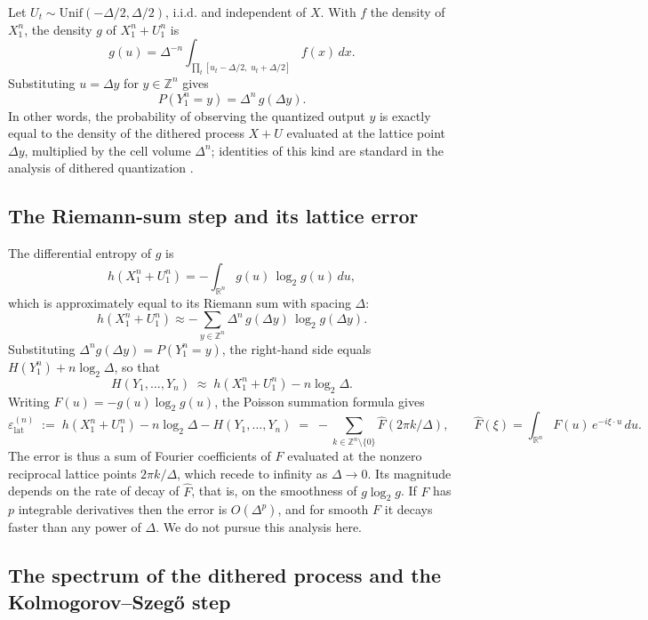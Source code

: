 \documentclass[11pt]{article}
\begin{document}
Let \(U_t \sim \mathrm{Unif}(-\Delta/2,\Delta/2)\), i.i.d. and independent of \(X\). With \(f\) the density of \(X_1^n\), the density \(g\) of \(X_1^n + U_1^n\) is
\[g(u) = \Delta^{-n}\int_{\prod_t [u_t - \Delta/2,\; u_t + \Delta/2]} f(x)\,dx.\]
Substituting \(u = \Delta y\) for \(y\in\mathbb Z^n\) gives
\[P(Y_1^n = y) = \Delta^n\,g(\Delta y).\]
In other words, the probability of observing the quantized output \(y\) is exactly equal to the density of the dithered process \(X + U\) evaluated at the lattice point \(\Delta y\), multiplied by the cell volume \(\Delta^n\); identities of this kind are standard in the analysis of dithered quantization \cite{GrayStockham1993}.

\subsection{The Riemann-sum step and its lattice error}\label{the-riemann-sum-step-and-its-lattice-error}

The differential entropy of \(g\) is
\[h(X_1^n + U_1^n) = -\int_{\mathbb R^n} g(u)\,\log_2 g(u)\,du,\]
which is approximately equal to its Riemann sum with spacing \(\Delta\):
\[h(X_1^n + U_1^n) \approx -\sum_{y\in\mathbb Z^n}\Delta^n\,g(\Delta y)\,\log_2 g(\Delta y).\]
Substituting \(\Delta^n g(\Delta y) = P(Y_1^n = y)\), the right-hand side equals \(H(Y_1^n) + n\log_2\Delta\), so that
\[H(Y_1,\dots,Y_n) \;\approx\; h(X_1^n + U_1^n) - n\log_2\Delta.\]
Writing \(F(u) = -g(u)\log_2 g(u)\), the Poisson summation formula gives
\[\varepsilon_{\mathrm{lat}}^{(n)} \;:=\; h(X_1^n + U_1^n) - n\log_2\Delta - H(Y_1,\dots,Y_n) \;=\; -\sum_{k\in\mathbb Z^n\setminus\{0\}}\hat F(2\pi k/\Delta), \qquad \hat F(\xi) = \int_{\mathbb R^n} F(u)\,e^{-i\xi\cdot u}\,du.\]
The error is thus a sum of Fourier coefficients of \(F\) evaluated at the nonzero reciprocal lattice points \(2\pi k/\Delta\), which recede to infinity as \(\Delta\to 0\). Its magnitude depends on the rate of decay of \(\hat F\), that is, on the smoothness of \(g\log_2 g\). If \(F\) has \(p\) integrable derivatives then the error is \(O(\Delta^p)\), and for smooth \(F\) it decays faster than any power of \(\Delta\). We do not pursue this analysis here.

\subsection{The spectrum of the dithered process and the Kolmogorov--Szegő step}\label{the-spectrum-of-the-dithered-process-and-the-kolmogorovszegux151-step}
\end{document}
